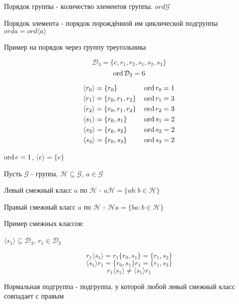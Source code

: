 \documentclass[../main/document.tex]{subfiles}
\begin{document}
\begin{dfn}
Порядок группы - количество элементов группы. $ord\mathcal{G}$
\end{dfn}
\begin{dfn}
Порядок элемента - порядок порождённой им циклической подгруппы $orda=ord\langle a\rangle$
\end{dfn}

\begin{exm}
Пример на порядок через группу треугольника

$$\mathcal{D}_3=\{e,r_1,r_2,s_1,s_2,s_3\}$$
$$\operatorname{ord} \mathcal{D}_3=6$$

\begin{align*}
&\langle r_0\rangle=\{r_0\} & &\operatorname{ord} r_0=1\\
&\langle r_1\rangle=\{r_0,r_1,r_2\} & &\operatorname{ord} r_1=3\\
&\langle r_2\rangle=\{r_0,r_1,r_2\} & &\operatorname{ord} r_2=3\\
&\langle s_1\rangle=\{r_0,s_1\} & &\operatorname{ord} s_1=2\\
&\langle s_2\rangle=\{r_0,s_2\} & &\operatorname{ord} s_2=2\\
&\langle s_3\rangle=\{r_0,s_3\} & &\operatorname{ord} s_3=2
\end{align*}

\end{exm}

\begin{cnsq}
$\operatorname{ord} e=1$, $\langle e\rangle=\{e\}$
\end{cnsq}
\begin{dfn}
Пусть $\mathcal{G}$ - группа, $\mathcal{H}\subseteq \mathcal{G}$, $a\in \mathcal{G}$

Левый смежный класс $a$ по $\mathcal{H}$ - $a\mathcal{H}=\{ab: b\in \mathcal{H}\}$

Правый смежный класс $a$ по $\mathcal{H}$ - $\mathcal{H}a=\{ba: b\in \mathcal{H}\}$
\end{dfn}

\begin{exm}
Пример смежных классов:

$\langle s_1\rangle \subseteq \mathcal{D}_3$, $r_1\in \mathcal{D}_3$

$$r_1\langle s_1\rangle = r_1\{r_0,s_1\}=\{r_1,s_2\}$$
$$\langle s_1\rangle r_1 = \{r_0,s_1\}r_1=\{r_1,s_3\}$$
$$r_1\langle s_1\rangle \neq \langle s_1\rangle r_1$$
\end{exm}

\begin{dfn}
Нормальная подгруппа - подгруппа, у которой любой левый смежный класс совпадает с правым
\end{dfn}
\end{document}

